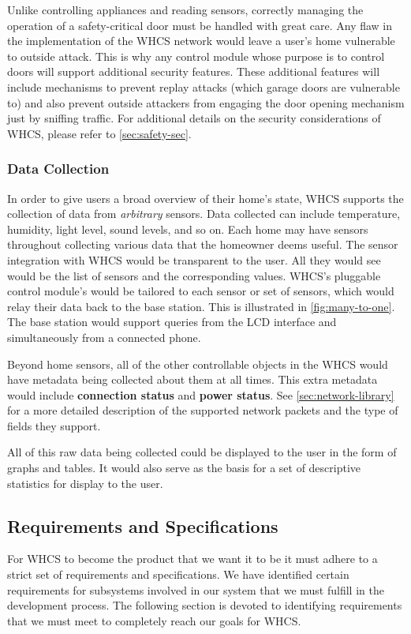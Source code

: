 Unlike controlling appliances and reading sensors, correctly managing the
operation of a safety-critical door must be handled with great care. Any flaw
in the implementation of the WHCS network would leave a user's home vulnerable
to outside attack. This is why any control module whose purpose is to control
doors will support additional security features. These additional features will
include mechanisms to prevent replay attacks (which garage doors are vulnerable
to) and also prevent outside attackers from engaging the door opening mechanism
just by sniffing traffic. For additional details on the security considerations
of WHCS, please refer to \autoref{sec:safety-sec}.

\subsubsection{Data Collection}
In order to give users a broad overview of their home's state, WHCS supports
the collection of data from \emph{arbitrary} sensors. Data collected can
include temperature, humidity, light level, sound levels, and so on. Each home
may have sensors throughout collecting various data that the homeowner deems
useful. The sensor integration with WHCS would be transparent to the user. All
they would see would be the list of sensors and the corresponding values.
WHCS's pluggable control module's would be tailored to each sensor or set of
sensors, which would relay their data back to the base station. This is
illustrated in \autoref{fig:many-to-one}. The base station would support
queries from the LCD interface and simultaneously from a connected phone.


Beyond home sensors, all of the other controllable objects in the WHCS
would have metadata being collected about them at all times. This extra metadata
would include \textbf{connection status} and \textbf{power status}. See
\autoref{sec:network-library} for a more detailed description of the supported
network packets and the type of fields they support.

All of this raw data being collected could be displayed to the user in the form
of graphs and tables. It would also serve as the basis for a set of descriptive
statistics for display to the user.

\subsection{Requirements and Specifications}
For WHCS to become the product that we want it to be it must adhere to a strict
set of requirements and specifications.  We have identified certain
requirements for subsystems involved in our system that we must fulfill in the
development process. The following section is devoted to identifying
requirements that we must meet to completely reach our goals for WHCS.

